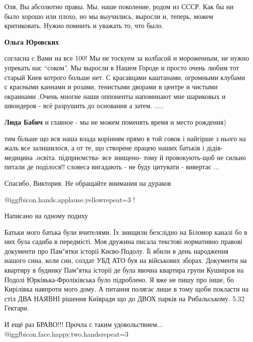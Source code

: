 \begin{itemize}
\begin{itemize}
Оля, Вы абсолютно правы. Мы, наше поколение, родом из СССР. Как бы ни было хорошо
или плохо, но мы выучились, выросли и, теперь, можем критиковать. Нужно помнить и
уважать то, что было.

\textbf{Ольга Юровских} 

согласна с Вами на все 100! Мы не тоскуем за колбасой и мороженным, не нужно
упрекать нас \enquote{соком}. Мы выросли в Нашем Городе и просто очень любим тот
старый Киев котрого больше нет. С красавцами каштанами, огромными клубами с
красными каннами и розами, тенистыми дворами в центре и чистыми окраинами
.Очень многие наши оппоненты напоминают мне шариковых и швондеров - всё
разрушить до основания а затем. .....

\textbf{Люда Бабич} и главное - мы не можем поменять время и место рождения)


тим більше що вся наша влада корінням прямо в той совок і найгірше з нього на
жаль все залишилося, а от те, що створене працею наших батьків і дідів-медицина
.освіта. підприємства- все знищено- тому й провокують-щоб не сильно питали де
поділося!! словеса вигадають - не буду цитувати - вивертає ...

\end{itemize} %

Спасибо, Виктория. Не обращайте внимания на дураков

 @igg{fbicon.hands.applause.yellow}{repeat=3} !

Написано на одному подиху


Батьки мого батька були вчителями. Їх знищили безслідно на Біломор каналі бо в
них була садиба в передмісті. Моя дружина писала текстові нормативно правові
документи про Пам"ятки історії Києво-Подолу. Її вбили в день народження нашого
сина, коли син, солдат УБД АТО був на військових зборах. Документи на квартиру
в будинку Пам"ятка історії де була явочна квартира групи Кушніров на Подолі
Юрківька-Фроліківська було підроблено. Я вже не пишу про інше, бо Кирілівка
навпроти мого дому. А питання полягає лише в тому щоби покласти на стіл ДВА
НАЯВНІ рішення Київради що до ДВОХ парків на Рибальському. 5.32 Гектари.


И ещё раз БРАВО!!!
Прочла с таким удовольствием...
 @igg{fbicon.face.happy.two.hands}{repeat=3} 


\end{itemize}

